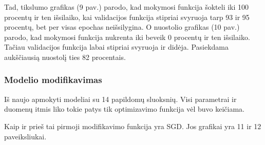 \documentclass{VUMIFPSkursinis}
\begin{document}
Tad, tikslumo grafikas (9 pav.) parodo, kad mokymosi funkcija šokteli iki 100 procentų ir ten išsilaiko, kai validacijos funkcija stipriai svyruoja tarp 93 ir 95 procentų, bet per visas epochas neišsilygina.
O nuostolio grafikas (10 pav.) parodo, kad mokymosi funkcija nukrenta iki beveik 0 procentų ir ten išsilaiko. Tačiau validacijos funkcija labai stipriai svyruoja ir didėja. Pasiekdama aukščiausią nuostolį ties 82 procentais.

\subsubsection{Modelio modifikavimas}
Iš naujo apmokyti modeliai su 14 papildomų sluoksnių. Visi parametrai ir duomenų itmis liko tokie patys tik optimizavimo funkcija vėl buvo keičiama.

Kaip ir prieš tai pirmoji modifikavimo funkcija yra SGD. Jos grafikai yra 11 ir 12 paveiksliukai.
\end{document}
